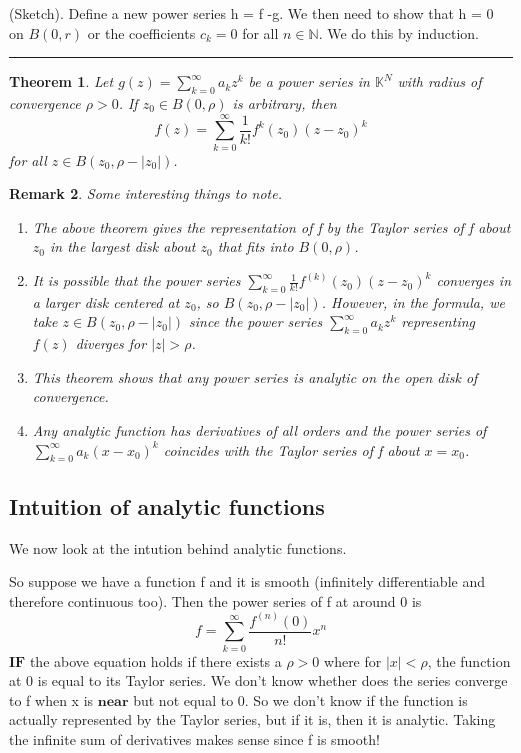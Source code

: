 \documentclass[twoside]{article}
\newcounter{lecnum}
\newtheorem{theorem}{Theorem}[lecnum]
\newtheorem{remark}[theorem]{Remark}
\newenvironment{proof}{{\bf Proof:}}{\hfill\rule{2mm}{2mm}}
\begin{document}
\begin{proof}(Sketch). Define a new power series h = f -g. We then need to show that h = 0 on $B(0,r)$ or the coefficients $c_k = 0$ for all $n \in \mathbb{N}$. We do this by induction.
\end{proof}

\begin{theorem}Let $g(z) = \sum_{k=0}^{\infty}a_kz^k$ be a power series in $\mathbb{K}^N$ with radius of convergence $\rho > 0$. If $z_0 \in B(0,\rho)$ is arbitrary, then 
$$
f(z) = \sum_{k=0}^{\infty}\frac{1}{k!}f^{k}(z_0)(z-z_0)^{k}
$$
for all $z \in B(z_0, \rho - |z_0|)$.
\end{theorem}

\begin{remark} Some interesting things to note. 
\begin{enumerate}
    \item The above theorem gives the representation of f by the Taylor series of f about $z_0$ in the largest disk about $z_0$ that fits into $B(0,\rho)$.
    \item It is possible that the power series $\sum_{k=0}^{\infty}\frac{1}{k!}f^{(k)}(z_0)(z - z_0)^k$ converges in a larger disk centered at $z_0$, so $B(z_0, \rho - |z_0|)$. However, in the formula, we take $z \in B(z_0, \rho - |z_0|)$ since the power series $\sum_{k=0}^{\infty}a_kz^k$ representing $f(z)$ diverges for $|z| > \rho$.
    \item This theorem shows that any power series is analytic on the open disk of convergence.
    \item Any analytic function has derivatives of all orders and the power series of $\sum_{k=0}^{\infty}a_k(x-x_0)^k$ coincides with the Taylor series of f about $x = x_0$.

\end{enumerate}
\end{remark}

\subsection{Intuition of analytic functions}

We now look at the intution behind analytic functions. 

So suppose we have a function f and it is smooth (infinitely differentiable and therefore continuous too). Then the power series of f at around 0 is
$$
f = \sum_{k=0}^{\infty}\frac{f^{(n)}(0)}{n!}x^n
$$
$\textbf{IF}$ the above equation holds if there exists a $\rho > 0$ where for $|x| < \rho$, the function at 0 is equal to its Taylor series. We don't know whether does the series converge to f when x is $\textbf{near}$ but not equal to 0. So we don't know if the function is actually represented by the Taylor series, but if it is, then it is analytic. Taking the infinite sum of derivatives makes sense since f is smooth! 
\end{document}
